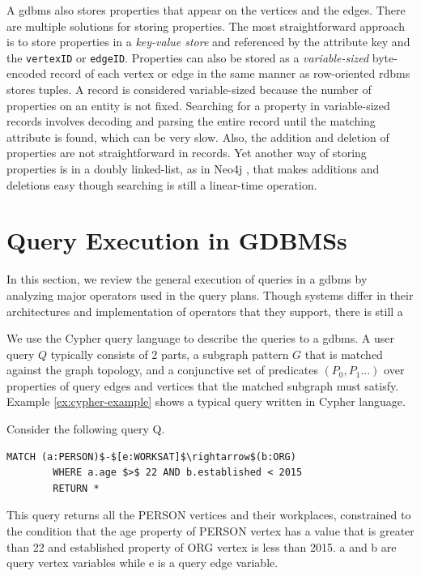 A \gls{gdbms} also stores properties that appear on the vertices and the edges. There are multiple solutions for storing properties. The most straightforward approach is to store properties in a \emph{key-value store} \cite{dgraph} and referenced by the attribute key and the \texttt{vertexID} or \texttt{edgeID}. Properties can also be stored as a \emph{variable-sized} byte-encoded record of each vertex or edge in the same manner as row-oriented \gls{rdbms} stores tuples. A record is considered variable-sized because the number of properties on an entity is not fixed. Searching for a property in variable-sized records involves decoding and parsing the entire record until the matching attribute is found, which can be very slow. Also, the addition and deletion of properties are not straightforward in records. Yet another way of storing properties is in a doubly linked-list, as in Neo4j \cite{neo4j}, that makes additions and deletions easy though searching is still a linear-time operation.

\section{Query Execution in GDBMSs}
\label{sec:operators}

In this section, we review the general execution of queries in a \gls{gdbms} by analyzing major operators used in the query plans. Though systems differ in their architectures and implementation of operators that they support, there is still a 

We use the Cypher query language \cite{cypher} to describe the queries to a \gls{gdbms}.  A user query $Q$ typically consists of 2 parts, 
a subgraph pattern $G$ that is matched against the graph topology, and a conjunctive set of predicates $(P_0, P_1 ...)$ over properties of query edges and vertices that the matched subgraph must satisfy. Example \ref{ex:cypher-example} shows a typical query written in Cypher language.

\vspace{-4pt}
\begin{example}
	\label{ex:cypher-example}
	Consider the following query Q. 
	{\em 
		\begin{lstlisting}[numbers=none,  showstringspaces=false,belowskip=0pt ]
		MATCH (a:PERSON)$-$[e:WORKSAT]$\rightarrow$(b:ORG)
		WHERE a.age $>$ 22 AND b.established < 2015
		RETURN *\end{lstlisting}
	}
	This query returns all the PERSON vertices and their workplaces, constrained to the condition that the \textsc{}age\textsc{} property of PERSON vertex has a value that is greater than 22 and \textsc{}established\textsc{} property of ORG vertex is less than 2015. a and b are query vertex variables while e is a query edge variable.
\end{example}
\vspace{-5pt}

